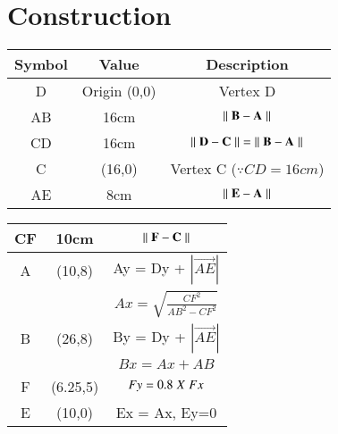 \documentclass[journal,12pt,twocolumn]{IEEEtran}
\begin{document}
\section{Construction}
\vspace{0.5cm}
\begin{tabular}{|c|c|c|}
\hline
Symbol & Value & Description\\
\hline
D & Origin (0,0) & Vertex D \\
\hline
AB & 16cm & $\|\hspace{0.1cm} \vec{B} - \vec{A} \hspace{0.1cm}\|$ \\
\hline
CD & 16cm & $\|\hspace{0.1cm} \vec{D} - \vec{C} \hspace{0.1cm}\| = \|\hspace{0.1cm} \vec{B} - \vec{A} \hspace{0.1cm}\|$ \\
\hline
C & (16,0) & Vertex C ($\because CD = 16cm$)\\
\hline
AE & 8cm & $\|\hspace{0.1cm} \vec{E} - \vec{A} \hspace{0.1cm}\|$ \\
\hline

\end{tabular}
\begin{tabular}{|c|c|c|}

\hline
CF & 10cm & $\|\hspace{0.1cm} \vec{F} - \vec{C} \hspace{0.1cm}\|$ \\
\hline

A & (10,8) & Ay = Dy + $|\overrightarrow{AE}|$\\
 & & $Ax = \sqrt{\frac{CF^2}{AB^2 - CF^2}}$\\
 
\hline

B & (26,8) & By = Dy + $|\overrightarrow{AE}|$\\
 & & $Bx = Ax + AB$\\
 
\hline
F & (6.25,5) & $Fy = 0.8 \hspace{0.1cm} X\hspace{0.1cm} Fx$\\
\hline

E & (10,0) & Ex = Ax, Ey=0 \\
\hline

\end{tabular}
\end{document}

